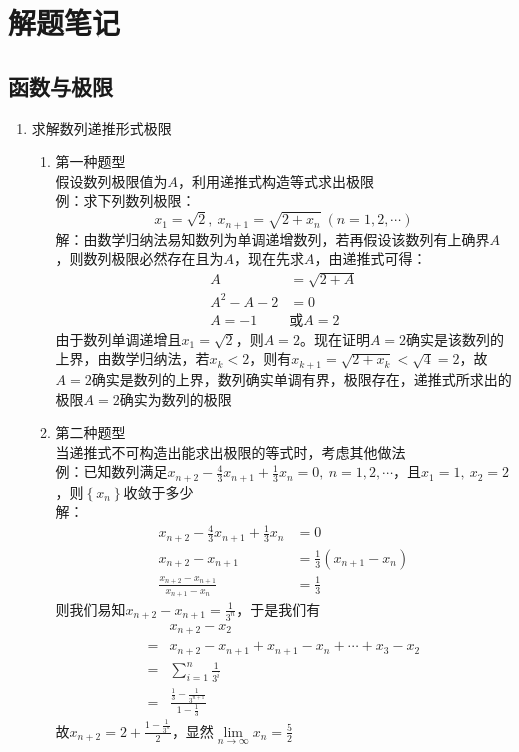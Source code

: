 \documentclass[12pt,a4paper,UTF8]{book}
\begin{document}
\chapter{解题笔记}

\section{函数与极限}
\begin{enumerate}
\item 求解数列递推形式极限
\begin{enumerate}
\item 第一种题型\\
假设数列极限值为$A$，利用递推式构造等式求出极限\\
例：求下列数列极限：
\[x_1=\sqrt{2},\ x_{n+1}=\sqrt{2+x_n}\ \left(n=1,2,\cdots\right)\]
解：由数学归纳法易知数列为单调递增数列，若再假设该数列有上确界$A$，则数列极限必然存在且为$A$，现在先求$A$，由递推式可得：
\[\begin{aligned}
A&=\sqrt{2+A}\\
A^2-A-2&=0\\
A=-1&\text{或}A=2
\end{aligned}\]
由于数列单调递增且$x_1=\sqrt{2}$，则$A=2$。现在证明$A=2$确实是该数列的上界，由数学归纳法，若$x_k<2$，则有$x_{k+1}=\sqrt{2+x_k}<\sqrt{4}=2$，故$A=2$确实是数列的上界，数列确实单调有界，极限存在，递推式所求出的极限$A=2$确实为数列的极限
\item 第二种题型\\
当递推式不可构造出能求出极限的等式时，考虑其他做法\\
例：已知数列满足$x_{n+2}-\frac{4}{3}x_{n+1}+\frac{1}{3}x_n=0,\ n=1,2,\cdots$，且$x_1=1,\ x_2=2$，则$\left\{x_n\right\}$收敛于多少\\
解：
\[\begin{aligned}
x_{n+2}-\frac{4}{3}x_{n+1}+\frac{1}{3}x_n&=0\\
x_{n+2}-x_{n+1}&=\frac{1}{3}\left(x_{n+1}-x_n\right)\\
\frac{x_{n+2}-x_{n+1}}{x_{n+1}-x_n}&=\frac{1}{3}
\end{aligned}\]
则我们易知$x_{n+2}-x_{n+1}=\frac{1}{3^n}$，于是我们有
\[\begin{aligned}
&x_{n+2}-x_2\\
=&x_{n+2}-x_{n+1}+x_{n+1}-x_{n}+\cdots+x_3-x_2\\
=&\sum\limits_{i=1}^{n}\frac{1}{3^i}\\
=&\frac{\frac{1}{3}-\frac{1}{3^{n+1}}}{1-\frac{1}{3}}
\end{aligned}\]
故$x_{n+2}=2+\frac{1-\frac{1}{3^n}}{2}$，显然$\lim\limits_{n\to\infty}x_n=\frac{5}{2}$
\end{enumerate}
\end{enumerate}
\end{document}
